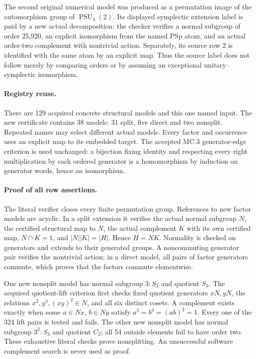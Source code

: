 \documentclass[11pt]{article}
\begin{document}
The second original numerical model was produced as a permutation image of
the automorphism group of $\operatorname{PSU}_4(2)$. Its displayed symplectic extension
label is paid by a new actual decomposition: the checker verifies a normal
subgroup of order 25,920, an explicit isomorphism from the named PSp atom,
and an actual order-two complement with nontrivial action. Separately, its
source row 2 is identified with the same atom by an explicit map. Thus the
source label does not follow merely by comparing orders or by assuming an
exceptional unitary--symplectic isomorphism.

\paragraph{Registry reuse.}
There are 129 acquired concrete structural models and this one named input.
The new certificate contains 38 models: 31 split, five direct and two
nonsplit. Repeated names may select different actual models. Every factor
and occurrence uses an explicit map to its embedded target. The accepted
MC.3 generator-edge criterion is used unchanged: a bijection fixing identity
and respecting every right multiplication by each ordered generator is a
homomorphism by induction on generator words, hence an isomorphism.

\newpage
\paragraph{Proof of all row assertions.}
The literal verifier closes every finite permutation group. References to
new factor models are acyclic. In a split extension it verifies the actual
normal subgroup $N$, the certified structural map to $N$, the actual
complement $K$ with its own certified map, $N\cap K=1$, and
$|N||K|=|H|$. Hence $H=NK$. Normality is checked on generators and extends
to their generated groups. A noncommuting generator pair verifies the
nontrivial action; in a direct model, all pairs of factor generators commute,
which proves that the factors commute elementwise.

One new nonsplit model has normal subgroup $3:S_3$ and quotient $S_3$.
The acquired quotient-lift criterion first checks fixed quotient generators
$xN,yN$, the relations $x^2,y^3,(xy)^2\in N$, and all six distinct cosets.
A complement exists exactly when some $a\in Nx$, $b\in Ny$ satisfy
$a^2=b^3=(ab)^2=1$. Every one of the 324 lift pairs is tested and fails.
The other new nonsplit model has normal subgroup $3^2:S_3$ and quotient
$C_2$; all 54 outside elements fail to have order two. These exhaustive
literal checks prove nonsplitting. An unsuccessful software complement
search is never used as proof.
\end{document}
